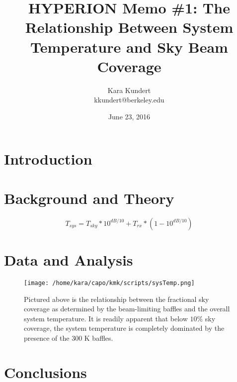 \documentclass[11pt]{article}
\makeatletter
\newcommand{\thetitle}{HYPERION Memo \#1: The Relationship Between System 
Temperature and Sky Beam Coverage}
\newcommand{\theauthor}{Kara Kundert}
\newcommand{\theauthorsemail}{kkundert@berkeley.edu}
\newcommand{\thedate}{June 23, 2016}
\makeatother
\begin{document}
\title{
    \sffamily\bfseries\huge
    \thetitle \\
}
\author{
    \sffamily\theauthor \\
    \sffamily\theauthorsemail
}
\date{\thedate}
\maketitle
\sloppy

\section{Introduction}


\section{Background and Theory}

\begin{equation}
    \label{eq:sys-temp}
    T_{sys} = T_{sky} * 10^{dB/10} + T_{rx} * (1 - 10^{dB/10})
\end{equation}



\section{Data and Analysis}

\begin{figure}
    \begin{center}
    \texttt{[image: /home/kara/capo/kmk/scripts/sysTemp.png]}
    \end{center}
    \caption{
        Pictured above is the relationship between the fractional sky coverage 
        as determined by the beam-limiting baffles and the overall system 
        temperature. It is readily apparent that below $10\%$ sky coverage, the 
        system temperature is completely dominated by the presence of the 300 K 
        baffles.
    }
    \label{fig:sys-temp}
\end{figure}

\section{Conclusions}


{}

\end{document}
